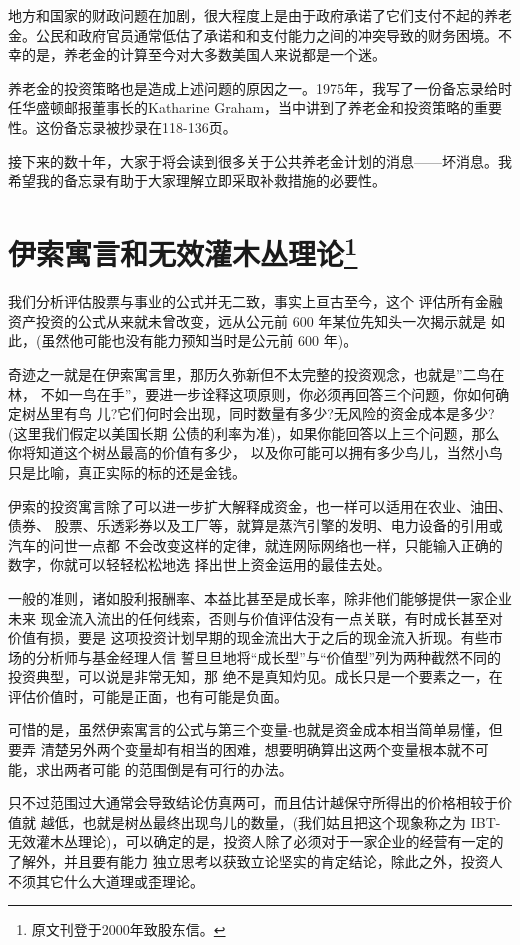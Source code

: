 \documentclass[UTF8,a4paper,zihao=-4,fontset = windows]{ctexart} %
\begin{document}
地方和国家的财政问题在加剧，很大程度上是由于政府承诺了它们支付不起的养老金。公民和政府官员通常低估了承诺和和支付能力之间的冲突导致的财务困境。不幸的是，养老金的计算至今对大多数美国人来说都是一个迷。

养老金的投资策略也是造成上述问题的原因之一。1975年，我写了一份备忘录给时任华盛顿邮报董事长的Katharine Graham，当中讲到了养老金和投资策略的重要性。这份备忘录被抄录在118-136页。

接下来的数十年，大家于将会读到很多关于公共养老金计划的消息——坏消息。我希望我的备忘录有助于大家理解立即采取补救措施的必要性。

\section[伊索寓言和无效灌木丛理论]{伊索寓言和无效灌木丛理论\footnote{原文刊登于2000年致股东信。}}

我们分析评估股票与事业的公式并无二致，事实上亘古至今，这个
评估所有金融资产投资的公式从来就未曾改变，远从公元前 600 年某位先知头一次揭示就是
如此，(虽然他可能也没有能力预知当时是公元前 600 年)。

奇迹之一就是在伊索寓言里，那历久弥新但不太完整的投资观念，也就是”二鸟在林，
不如一鸟在手”，要进一步诠释这项原则，你必须再回答三个问题，你如何确定树丛里有鸟
儿?它们何时会出现，同时数量有多少?无风险的资金成本是多少?(这里我们假定以美国长期
公债的利率为准)，如果你能回答以上三个问题，那么你将知道这个树丛最高的价值有多少，
以及你可能可以拥有多少鸟儿，当然小鸟只是比喻，真正实际的标的还是金钱。

伊索的投资寓言除了可以进一步扩大解释成资金，也一样可以适用在农业、油田、债券、
股票、乐透彩券以及工厂等，就算是蒸汽引擎的发明、电力设备的引用或汽车的问世一点都
不会改变这样的定律，就连网际网络也一样，只能输入正确的数字，你就可以轻轻松松地选
择出世上资金运用的最佳去处。

一般的准则，诸如股利报酬率、本益比甚至是成长率，除非他们能够提供一家企业未来
现金流入流出的任何线索，否则与价值评估没有一点关联，有时成长甚至对价值有损，要是
这项投资计划早期的现金流出大于之后的现金流入折现。有些市场的分析师与基金经理人信
誓旦旦地将“成长型”与“价值型”列为两种截然不同的投资典型，可以说是非常无知，那
绝不是真知灼见。成长只是一个要素之一，在评估价值时，可能是正面，也有可能是负面。

可惜的是，虽然伊索寓言的公式与第三个变量-也就是资金成本相当简单易懂，但要弄
清楚另外两个变量却有相当的困难，想要明确算出这两个变量根本就不可能，求出两者可能
的范围倒是有可行的办法。

只不过范围过大通常会导致结论仿真两可，而且估计越保守所得出的价格相较于价值就
越低，也就是树丛最终出现鸟儿的数量，(我们姑且把这个现象称之为 IBT-无效灌木丛理论)，可以确定的是，投资人除了必须对于一家企业的经营有一定的了解外，并且要有能力
独立思考以获致立论坚实的肯定结论，除此之外，投资人不须其它什么大道理或歪理论。
\end{document}
